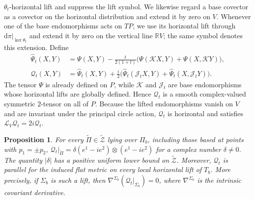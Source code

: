 \documentclass[11pt]{article}
\newtheorem{proposition}[theorem]{Proposition}
\theoremstyle{definition}
\theoremstyle{remark}
\newcommand{\R}{\mathbb R}
\newcommand{\tZ}{\widetilde{\mathcal Z}}
\newcommand{\Lie}{\mathcal L}
\newcommand{\dd}{\mathrm d}
\begin{document}
$\theta_t$-horizontal lift and suppress the lift symbol.  We likewise regard
a base covector as a covector on the horizontal distribution and extend it by
zero on $V$.  Whenever one of the base endomorphisms acts on $TP$, we use its
horizontal lift through $\dd\pi|_{\ker\theta_t}$ and extend it by zero on the
vertical line $\R V$; the same symbol denotes this extension.
Define
\[
 \begin{aligned}
 \widehat\Psi_t(X,Y)&=\Psi(X,Y)-\frac{t}{2(1+t)}
 \bigl(\Psi(\mathscr KX,Y)+\Psi(X,\mathscr KY)\bigr),\\
 \mathcal Q_t(X,Y)&=\widehat\Psi_t(X,Y)+\frac i2
 \bigl(\widehat\Psi_t(\mathscr J_tX,Y)
       +\widehat\Psi_t(X,\mathscr J_tY)\bigr).
 \end{aligned}
\]
The tensor $\Psi$ is already defined on $P$, while $\mathscr K$ and
$\mathscr J_t$ are base endomorphisms whose horizontal lifts are globally
defined.  Hence $\mathcal Q_t$ is a smooth complex-valued symmetric $2$-tensor
on all of $P$.  Because the lifted endomorphisms vanish on $V$ and are
invariant under the principal circle action, $\mathcal Q_t$ is horizontal
and satisfies $\Lie_V\mathcal Q_t=2i\mathcal Q_t$.
\begin{proposition}                                                 \label{prop:tensor-on-zero-curvature-planes}
For every $\widetilde\Pi\in\tZ$ lying over $\Pi_b$, including those based at
points with $p_1=\pm p_2$,
$\mathcal Q_t|_{\widetilde\Pi}=\delta(e^1-ie^2)\otimes(e^1-ie^2)$ for a complex number
$\delta\neq0$.  The quantity $|\delta|$ has a
positive uniform lower bound on $\tZ$.  Moreover, $\mathcal Q_t$ is
parallel for the induced flat metric on every local horizontal lift of
$T_b$.  More precisely, if $\Sigma_b$ is such a lift, then
$\nabla^{\Sigma_b}(\mathcal Q_t|_{\Sigma_b})=0$, where
$\nabla^{\Sigma_b}$ is the intrinsic covariant derivative.
\end{proposition}
\end{document}
